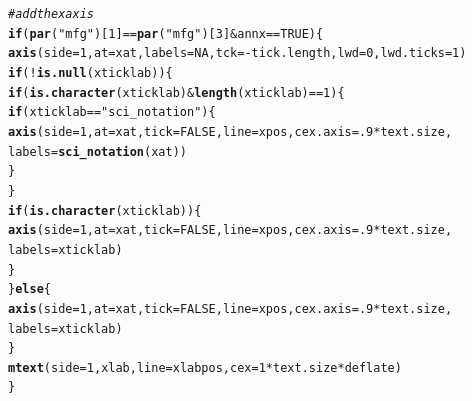 \documentclass{article}\usepackage[]{graphicx}\usepackage[]{color}
\makeatletter
\newcommand{\hlnum}[1]{\textcolor[rgb]{0.686,0.059,0.569}{#1}}%
\newcommand{\hlstr}[1]{\textcolor[rgb]{0.192,0.494,0.8}{#1}}%
\newcommand{\hlcom}[1]{\textcolor[rgb]{0.678,0.584,0.686}{\textit{#1}}}%
\newcommand{\hlopt}[1]{\textcolor[rgb]{0,0,0}{#1}}%
\newcommand{\hlstd}[1]{\textcolor[rgb]{0.345,0.345,0.345}{#1}}%
\newcommand{\hlkwa}[1]{\textcolor[rgb]{0.161,0.373,0.58}{\textbf{#1}}}%
\newcommand{\hlkwc}[1]{\textcolor[rgb]{0.333,0.667,0.333}{#1}}%
\newcommand{\hlkwd}[1]{\textcolor[rgb]{0.737,0.353,0.396}{\textbf{#1}}}%
\newenvironment{kframe}{%
 \def\at@end@of@kframe{}%
 \ifinner\ifhmode%
  \def\at@end@of@kframe{\end{minipage}}%
  \begin{minipage}{\columnwidth}%
 \fi\fi%
 \def\FrameCommand##1{\hskip\@totalleftmargin \hskip-\fboxsep
 \colorbox{shadecolor}{##1}\hskip-\fboxsep
     \hskip-\linewidth \hskip-\@totalleftmargin \hskip\columnwidth}%
 \MakeFramed {\advance\hsize-\width
   \@totalleftmargin\z@ \linewidth\hsize
   \@setminipage}}%
 {\par\unskip\endMakeFramed%
 \at@end@of@kframe}
\newenvironment{knitrout}{}{} %
\makeatother
\begin{document}
\begin{knitrout}
\begin{kframe}
\begin{alltt}
    \hlcom{# add the x axis}
    \hlkwa{if} \hlstd{(}\hlkwd{par}\hlstd{(}\hlstr{"mfg"}\hlstd{)[}\hlnum{1}\hlstd{]} \hlopt{==} \hlkwd{par}\hlstd{(}\hlstr{"mfg"}\hlstd{)[}\hlnum{3}\hlstd{]} \hlopt{&} \hlstd{annx} \hlopt{==} \hlnum{TRUE}\hlstd{) \{}
      \hlkwd{axis}\hlstd{(}\hlkwc{side} \hlstd{=} \hlnum{1}\hlstd{,} \hlkwc{at} \hlstd{= xat,} \hlkwc{labels} \hlstd{=} \hlnum{NA}\hlstd{,} \hlkwc{tck} \hlstd{=} \hlopt{-}\hlstd{tick.length,} \hlkwc{lwd} \hlstd{=} \hlnum{0}\hlstd{,} \hlkwc{lwd.ticks} \hlstd{=} \hlnum{1}\hlstd{)}
      \hlkwa{if} \hlstd{(}\hlopt{!}\hlkwd{is.null}\hlstd{(xticklab)) \{}
        \hlkwa{if} \hlstd{(}\hlkwd{is.character}\hlstd{(xticklab)} \hlopt{&} \hlkwd{length}\hlstd{(xticklab)} \hlopt{==} \hlnum{1}\hlstd{) \{}
          \hlkwa{if} \hlstd{(xticklab} \hlopt{==} \hlstr{"sci_notation"}\hlstd{) \{}
            \hlkwd{axis}\hlstd{(}\hlkwc{side} \hlstd{=} \hlnum{1}\hlstd{,} \hlkwc{at} \hlstd{= xat,} \hlkwc{tick} \hlstd{=} \hlnum{FALSE}\hlstd{,} \hlkwc{line} \hlstd{= xpos,} \hlkwc{cex.axis} \hlstd{=}  \hlnum{.9}\hlopt{*}\hlstd{text.size,}
                 \hlkwc{labels} \hlstd{=} \hlkwd{sci_notation}\hlstd{(xat))}
          \hlstd{\}}
        \hlstd{\}}
        \hlkwa{if} \hlstd{(}\hlkwd{is.character}\hlstd{(xticklab)) \{}
          \hlkwd{axis}\hlstd{(}\hlkwc{side} \hlstd{=} \hlnum{1}\hlstd{,} \hlkwc{at} \hlstd{= xat,} \hlkwc{tick} \hlstd{=} \hlnum{FALSE}\hlstd{,} \hlkwc{line} \hlstd{= xpos,} \hlkwc{cex.axis} \hlstd{=}  \hlnum{.9}\hlopt{*}\hlstd{text.size,}
               \hlkwc{labels} \hlstd{= xticklab)}
        \hlstd{\}}
      \hlstd{\}} \hlkwa{else} \hlstd{\{}
        \hlkwd{axis}\hlstd{(}\hlkwc{side} \hlstd{=} \hlnum{1}\hlstd{,} \hlkwc{at} \hlstd{= xat,} \hlkwc{tick} \hlstd{=} \hlnum{FALSE}\hlstd{,} \hlkwc{line} \hlstd{= xpos,} \hlkwc{cex.axis} \hlstd{=}  \hlnum{.9}\hlopt{*}\hlstd{text.size,}
             \hlkwc{labels} \hlstd{= xticklab)}
      \hlstd{\}}
      \hlkwd{mtext}\hlstd{(}\hlkwc{side} \hlstd{=} \hlnum{1}\hlstd{, xlab,} \hlkwc{line} \hlstd{= xlabpos,} \hlkwc{cex} \hlstd{=} \hlnum{1}\hlopt{*}\hlstd{text.size}\hlopt{*}\hlstd{deflate)}
    \hlstd{\}}


\end{alltt}
\end{kframe}
\end{knitrout}
\end{document}
